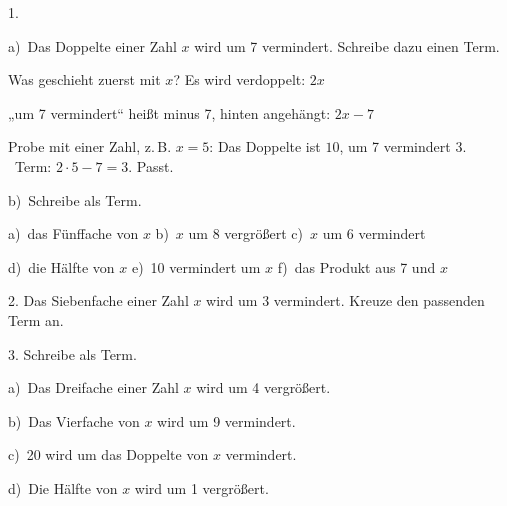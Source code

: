 \documentclass[11pt]{article}
\newcommand{\kennung}{BGG}
\newcommand{\grau}[1]{{\color{mbgrau}#1}}
\begin{document}
\pfheftstil
\fancyfoot[C]{\parbox[t]{\textwidth}{\mbfhbox\par\vspace{1.5mm}{\footnotesize\color{mbgrau}{\scriptsize \kennung}\hfill\thepage}}}
\begin{pfaufg}{}{1.}{}
\grau{a)\ Das Doppelte einer Zahl $x$ wird um 7 vermindert. Schreibe dazu einen Term.\par\smallskip Was geschieht zuerst mit $x$? Es wird verdoppelt: \quad $2x$\par „um 7 vermindert“ heißt minus 7, hinten angehängt: \quad $2x - 7$\par Probe mit einer Zahl, z.\,B. $x = 5$: Das Doppelte ist $10$, um 7 vermindert $3$. \ Term: $2 \cdot 5 - 7 = 3$. Passt.}
\par\medskip
b)\ Schreibe als Term. \par\vspace{3pt} a)~das Fünffache von $x$ \qquad b)~$x$ um 8 vergrößert \qquad c)~$x$ um 6 vermindert \par\vspace{3pt} d)~die Hälfte von $x$ \qquad e)~10 vermindert um $x$ \qquad f)~das Produkt aus 7 und $x$
\end{pfaufg}

\begin{pfaufg}{}{2.}{}
Das Siebenfache einer Zahl $x$ wird um 3 vermindert. Kreuze den passenden Term an.\par\smallskip {}\par {}
\end{pfaufg}

\begin{pfaufg}{}{3.}{}
Schreibe als Term. \par\vspace{3pt} a)~Das Dreifache einer Zahl $x$ wird um 4 vergrößert. \par b)~Das Vierfache von $x$ wird um 9 vermindert. \par c)~20 wird um das Doppelte von $x$ vermindert. \par d)~Die Hälfte von $x$ wird um 1 vergrößert.
\end{pfaufg}
\end{document}
